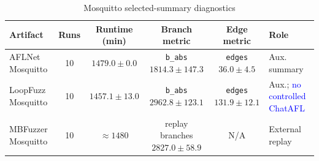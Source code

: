 \documentclass[final,5p,times,number]{elsarticle}
\begin{document}
\begin{table}[!t]
\centering
\caption{Auxiliary state-exploration \textcolor{blue}{cross-artifact diagnostics (incomparable metric surfaces). \textbf{Different instrumentation; NOT directly comparable to AFLNet-lineage \texttt{b\_abs}/\texttt{edges}; Sec.~\ref{sec:lightftp_anomaly}.}}}
\vspace{-0.15em}
\label{tab:aux_edge_artifact}
{\scriptsize
\setlength{\tabcolsep}{5.0pt}
\renewcommand{\arraystretch}{0.95}
}
\end{table}

\begin{table}[!t]
\centering
\caption{Mosquitto selected-summary diagnostics}
\label{tab:mqtt_artifact_integrity}
{\scriptsize
\setlength{\tabcolsep}{4.0pt}
\renewcommand{\arraystretch}{0.96}
\begin{tabular}{@{}l c c c c l@{}}
\toprule
Artifact & Runs & Runtime (min) & Branch metric & Edge metric & Role \\
\midrule
AFLNet Mosquitto & 10 & $1479.0 {\pm} 0.0$ & \texttt{b\_abs} $1814.3 {\pm} 147.3$ & \texttt{edges} $36.0 {\pm} 4.5$ & Aux. summary \\
LoopFuzz Mosquitto & 10 & $1457.1 {\pm} 13.0$ & \texttt{b\_abs} $2962.8 {\pm} 123.1$ & \texttt{edges} $131.9 {\pm} 12.1$ & Aux.; \textcolor{blue}{no controlled ChatAFL} \\
MBFuzzer Mosquitto & 10 & $\approx 1480$ & replay branches $2827.0 {\pm} 58.9$ & N/A & External replay \\
\bottomrule
\end{tabular}
}
\end{table}
\end{document}
